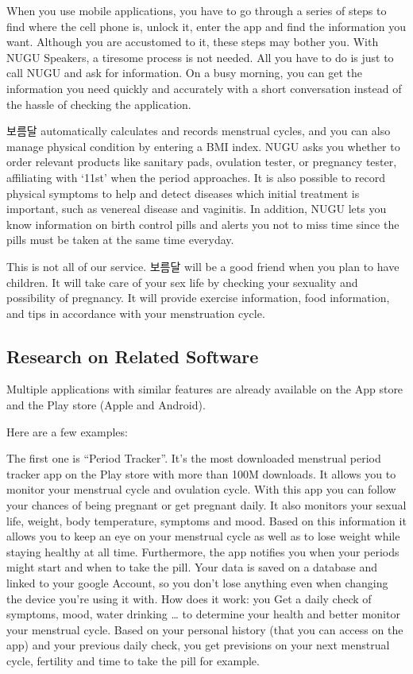 \documentclass[conference]{IEEEtran}
\begin{document}
When you use mobile applications, you have to go through a series of steps to find where the cell phone is, unlock it, enter the app and find the information you want. Although you are accustomed to it, these steps may bother you. With NUGU Speakers, a tiresome process is not needed. All you have to do is just to call NUGU and ask for information. On a busy morning, you can get the information you need quickly and accurately with a short conversation instead of the hassle of checking the application.

보름달 automatically calculates and records menstrual cycles, and you can also manage physical condition by entering a BMI index. NUGU asks you whether to order relevant products like sanitary pads, ovulation tester, or pregnancy tester, affiliating with ‘11st’ when the period approaches. It is also possible to record physical symptoms to help and detect diseases which initial treatment is important, such as venereal disease and vaginitis. In addition, NUGU lets you know information on birth control pills and alerts you not to miss time since the pills must be taken at the same time everyday. 

This is not all of our service. 보름달 will be a good friend when you plan to have children. It will take care of your sex life by checking your sexuality and possibility of pregnancy. It will provide exercise information, food information, and tips in accordance with your menstruation cycle.

\subsection{Research on Related Software}
Multiple applications with similar features are already available on the App store and the Play store (Apple and Android).

Here are a few examples: 

The first one is “Period Tracker”. It’s the most downloaded menstrual period tracker app on the Play store with more than 100M downloads. It allows you to monitor your menstrual cycle and ovulation cycle. With this app you can follow your chances of being pregnant or get pregnant daily. It also monitors your sexual life, weight, body temperature, symptoms and mood. Based on this information it allows you to keep an eye on your menstrual cycle as well as to lose weight while staying healthy at all time. Furthermore, the app notifies you when your periods might start and when to take the pill. Your data is saved on a database and linked to your google Account, so you don’t lose anything even when changing the device you’re using it with. How does it work: you Get a daily check of symptoms, mood, water drinking … to determine your health and better monitor your menstrual cycle. Based on your personal history (that you can access on the app) and your previous daily check, you get previsions on your next menstrual cycle, fertility and time to take the pill for example. 
\end{document}
